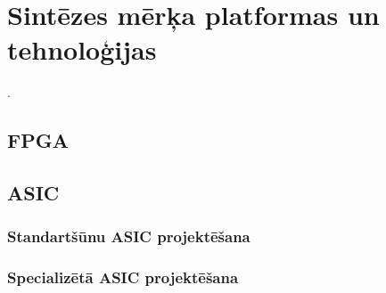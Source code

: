 \section{Sintēzes mērķa platformas un tehnoloģijas} \label{sec:synth}
\lipsum[10-10]
\cite[5.~lpp.]{HDL}.

\subsection{FPGA} \label{sec:fpga}
\lipsum[11-13]

\subsection{ASIC} \label{sec:asic}
\lipsum[14-15]
	\subsubsection{Standartšūnu ASIC projektēšana}
	\lipsum[16-16]

	\subsubsection{Specializētā ASIC projektēšana}
	\lipsum[17-17]
